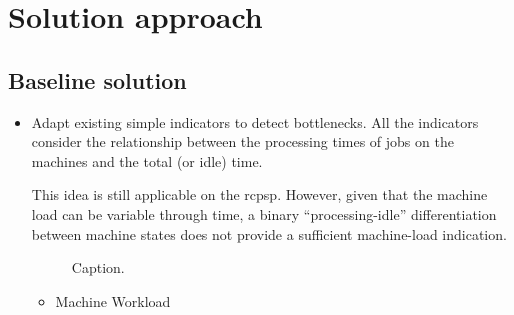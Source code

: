 \chapter{Solution approach}

\section{Baseline solution}

\begin{itemize}
    \item Adapt existing simple indicators to detect bottlenecks.
        All the indicators consider the relationship between the processing times of jobs on the machines
        and the total (or idle) time.
        
        This idea is still applicable on the \ac{rcpsp}. However, given that the machine load can be variable
        through time, a binary \enquote{processing-idle} differentiation between machine states does not
        provide a sufficient machine-load indication.

        

    \begin{figure}[ht]
      \centering
      \hfill
      \caption{Caption.}
    \end{figure}
    \begin{itemize}
        \item Machine Workload


\end{itemize}
\end{itemize}
